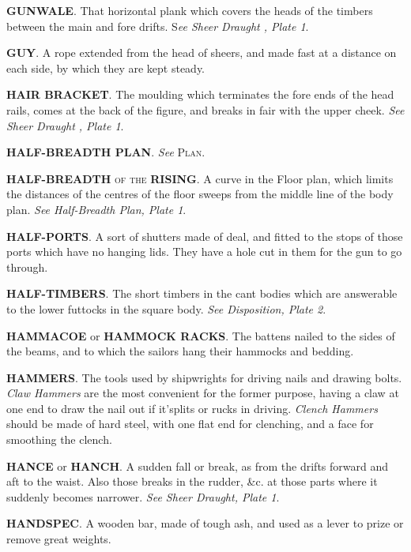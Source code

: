 \textbf{GUNWALE}. That horizontal plank which covers the heads of the timbers between the main and fore drifts. S\textit{ee Sheer Draught , Plate 1}. 

\textbf{GUY}. A rope extended from the head of sheers, and made fast at a distance on each side, by which they are kept steady. 

\textbf{HAIR BRACKET}. The moulding which terminates the fore ends of the head rails, comes at the back of the figure, and breaks in fair with the upper cheek. \textit{See Sheer Draught , Plate 1}. 

\textbf{HALF-BREADTH PLAN}. \textit{See} \textsc{Plan}. 

\textbf{HALF-BREADTH} \textsc{of the} \textbf{RISING}. A curve in the Floor plan, which limits the distances of the centres of the floor sweeps from the middle line of the body plan. \textit{See Half-Breadth Plan, Plate 1}. 

\textbf{HALF-PORTS}. A sort of shutters made of deal, and fitted to the stops of those ports which have no hanging lids. They have a hole cut in them for the gun to go through. 

\textbf{HALF-TIMBERS}. The short timbers in the cant bodies which are answerable to the lower futtocks in the square body. \textit{See Disposition, Plate 2}. 

\textbf{HAMMACOE} or \textbf{HAMMOCK RACKS}. The battens nailed to the sides of the beams, and to which the sailors hang their hammocks and bedding. 

\textbf{HAMMERS}. The tools used by shipwrights for driving nails and drawing bolts. \textit{Claw Hammers} are the most convenient for the former purpose, having a claw at one end to draw the nail out if it'splits or rucks in driving. \textit{Clench Hammers} should be made of hard steel, with one flat end for clenching, and a face for smoothing the clench. 

\textbf{HANCE} or \textbf{HANCH}. A sudden fall or break, as from the drifts forward and aft to the waist. Also those breaks in the rudder, \&c. at those parts where it suddenly becomes narrower. \textit{See Sheer Draught, Plate 1}. 

\textbf{HANDSPEC}. A wooden bar, made of tough ash, and used as a lever to prize or remove great weights. 

